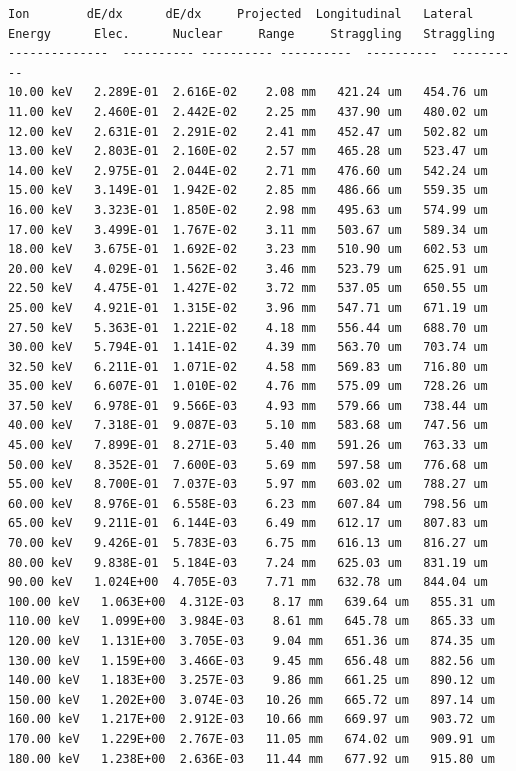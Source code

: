 \documentclass [11pt,a4paper,dvipdfmx] {jarticle}
\begin{document}
\begin{lstlisting}[caption={SRIMの出力ファイルの例。},basicstyle=\fontsize{6}{6}\ttfamily,identifierstyle=\fontsize{6}{6},numberstyle={\tiny},columns=fixed]
Ion        dE/dx      dE/dx     Projected  Longitudinal   Lateral
Energy      Elec.      Nuclear     Range     Straggling   Straggling
--------------  ---------- ---------- ----------  ----------  ----------
10.00 keV   2.289E-01  2.616E-02    2.08 mm   421.24 um   454.76 um  
11.00 keV   2.460E-01  2.442E-02    2.25 mm   437.90 um   480.02 um  
12.00 keV   2.631E-01  2.291E-02    2.41 mm   452.47 um   502.82 um  
13.00 keV   2.803E-01  2.160E-02    2.57 mm   465.28 um   523.47 um  
14.00 keV   2.975E-01  2.044E-02    2.71 mm   476.60 um   542.24 um  
15.00 keV   3.149E-01  1.942E-02    2.85 mm   486.66 um   559.35 um  
16.00 keV   3.323E-01  1.850E-02    2.98 mm   495.63 um   574.99 um  
17.00 keV   3.499E-01  1.767E-02    3.11 mm   503.67 um   589.34 um  
18.00 keV   3.675E-01  1.692E-02    3.23 mm   510.90 um   602.53 um  
20.00 keV   4.029E-01  1.562E-02    3.46 mm   523.79 um   625.91 um  
22.50 keV   4.475E-01  1.427E-02    3.72 mm   537.05 um   650.55 um  
25.00 keV   4.921E-01  1.315E-02    3.96 mm   547.71 um   671.19 um  
27.50 keV   5.363E-01  1.221E-02    4.18 mm   556.44 um   688.70 um  
30.00 keV   5.794E-01  1.141E-02    4.39 mm   563.70 um   703.74 um  
32.50 keV   6.211E-01  1.071E-02    4.58 mm   569.83 um   716.80 um  
35.00 keV   6.607E-01  1.010E-02    4.76 mm   575.09 um   728.26 um  
37.50 keV   6.978E-01  9.566E-03    4.93 mm   579.66 um   738.44 um  
40.00 keV   7.318E-01  9.087E-03    5.10 mm   583.68 um   747.56 um  
45.00 keV   7.899E-01  8.271E-03    5.40 mm   591.26 um   763.33 um  
50.00 keV   8.352E-01  7.600E-03    5.69 mm   597.58 um   776.68 um  
55.00 keV   8.700E-01  7.037E-03    5.97 mm   603.02 um   788.27 um  
60.00 keV   8.976E-01  6.558E-03    6.23 mm   607.84 um   798.56 um  
65.00 keV   9.211E-01  6.144E-03    6.49 mm   612.17 um   807.83 um  
70.00 keV   9.426E-01  5.783E-03    6.75 mm   616.13 um   816.27 um  
80.00 keV   9.838E-01  5.184E-03    7.24 mm   625.03 um   831.19 um  
90.00 keV   1.024E+00  4.705E-03    7.71 mm   632.78 um   844.04 um  
100.00 keV   1.063E+00  4.312E-03    8.17 mm   639.64 um   855.31 um  
110.00 keV   1.099E+00  3.984E-03    8.61 mm   645.78 um   865.33 um  
120.00 keV   1.131E+00  3.705E-03    9.04 mm   651.36 um   874.35 um  
130.00 keV   1.159E+00  3.466E-03    9.45 mm   656.48 um   882.56 um  
140.00 keV   1.183E+00  3.257E-03    9.86 mm   661.25 um   890.12 um  
150.00 keV   1.202E+00  3.074E-03   10.26 mm   665.72 um   897.14 um  
160.00 keV   1.217E+00  2.912E-03   10.66 mm   669.97 um   903.72 um  
170.00 keV   1.229E+00  2.767E-03   11.05 mm   674.02 um   909.91 um  
180.00 keV   1.238E+00  2.636E-03   11.44 mm   677.92 um   915.80 um  

\end{lstlisting}
\end{document}
